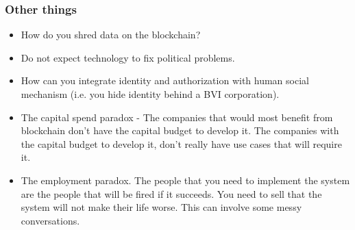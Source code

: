 \documentclass{beamer}
\begin{document}
\begin{frame}
  \frametitle{Other things}
  \begin{itemize}
  \item How do you shred data on the blockchain?
  \item Do not expect technology to fix political problems.
  \item How can you integrate identity and authorization with human
    social mechanism (i.e. you hide identity behind a BVI
    corporation).
  \item The capital spend paradox - The companies that would most
    benefit from blockchain don't have the capital budget to develop
    it.  The companies with the capital budget to develop it, don't
    really have use cases that will require it.
  \item The employment paradox.  The people that you need to implement
    the system are the people that will be fired if it succeeds.  You
    need to sell that the system will not make their life worse.  This
    can involve some messy conversations.
  \end{itemize}
\end{frame}
\end{document}
